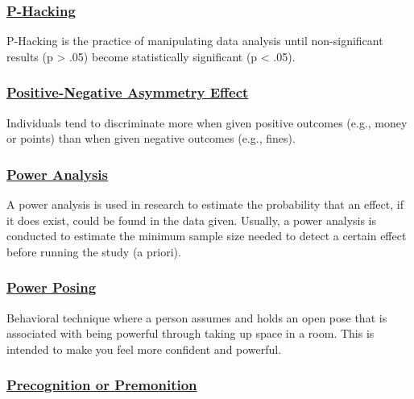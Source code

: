 \documentclass[
  letterpaper,
]{book}
\begin{document}
\subsubsection*{\texorpdfstring{\hyperref[def-phacking]{P-Hacking}}{P-Hacking}}\label{p-hacking}

P-Hacking is the practice of manipulating data analysis until
non-significant results (p \textgreater{} .05) become statistically
significant (p \textless{} .05).

\subsubsection*{\texorpdfstring{\hyperref[def-pnae]{Positive-Negative
Asymmetry
Effect}}{Positive-Negative Asymmetry Effect}}\label{positive-negative-asymmetry-effect}

Individuals tend to discriminate more when given positive outcomes
(e.g., money or points) than when given negative outcomes (e.g., fines).

\subsubsection*{\texorpdfstring{\hyperref[def-poweranalysis]{Power
Analysis}}{Power Analysis}}\label{power-analysis}

A power analysis is used in research to estimate the probability that an
effect, if it does exist, could be found in the data given. Usually, a
power analysis is conducted to estimate the minimum sample size needed
to detect a certain effect before running the study (a priori).

\subsubsection*{\texorpdfstring{\hyperref[def-powerposing]{Power
Posing}}{Power Posing}}\label{power-posing-1}

Behavioral technique where a person assumes and holds an open pose that
is associated with being powerful through taking up space in a room.
This is intended to make you feel more confident and powerful.

\subsubsection*{\texorpdfstring{\hyperref[def-precognition]{Precognition
or
Premonition}}{Precognition or Premonition}}\label{precognition-or-premonition}
\end{document}
